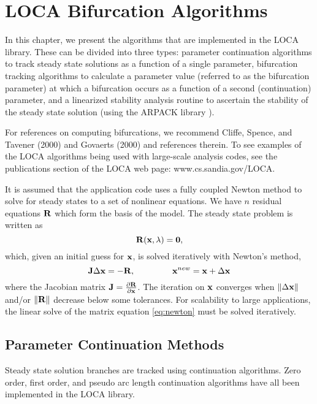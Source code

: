 \chapter{LOCA Bifurcation Algorithms} 
\label{ch:algorithms}

In this chapter, we present the algorithms that are implemented in the LOCA library. 
These can be divided into three types: parameter continuation algorithms to track steady state solutions as a function of a single parameter, bifurcation tracking algorithms to calculate a parameter value (referred to as the bifurcation parameter) at which a bifurcation occurs as a function of a second (continuation) parameter, and a linearized stability analysis routine to ascertain the stability of the steady state solution
(using the ARPACK library \cite{lehoucq98b,maschhoff96}).

For references on computing bifurcations, we recommend Cliffe, Spence, and Tavener (2000) \cite{tavener01} and Govaerts (2000) \cite{govaerts00} and references therein. To see examples of the LOCA algorithms being used with large-scale analysis codes, see the publications section of the LOCA web page: www.cs.sandia.gov/LOCA.

It is assumed that the application code uses a fully coupled Newton method to solve for steady states to a set of nonlinear equations. We have $n$ residual equations ${\bf R}$ which form the basis of the model. The steady state problem is written as
\begin{equation}
\label{eq:resid}
{\bf R} ({\bf x},\lambda) = {\bf 0},
\end{equation}
which, given an initial guess for ${\bf x}$, is solved iteratively with Newton's method,
\begin{equation}
\label{eq:newton}
{\bf J} \Delta{\bf x} = -{\bf R}, \mbox{\hspace{0.6in}}{\bf x}^{new}={\bf x} + \Delta{\bf x}
\end{equation}
where the Jacobian matrix $ {\bf J} = \frac{\partial {\bf R}}{\partial {\bf x}}$. The iteration on ${\bf x}$ converges when $\|\Delta{\bf x}\|$ and/or $\|{\bf R}\|$ decrease below some tolerances.
For scalability to large applications, the linear solve of the matrix equation \ref{eq:newton} must be solved iteratively.

\section{Parameter Continuation Methods}
\label{sec:pc}
Steady state solution branches are tracked using continuation algorithms. Zero order, first order, and pseudo arc length continuation \cite{keller77} algorithms have all been implemented in the LOCA library.

